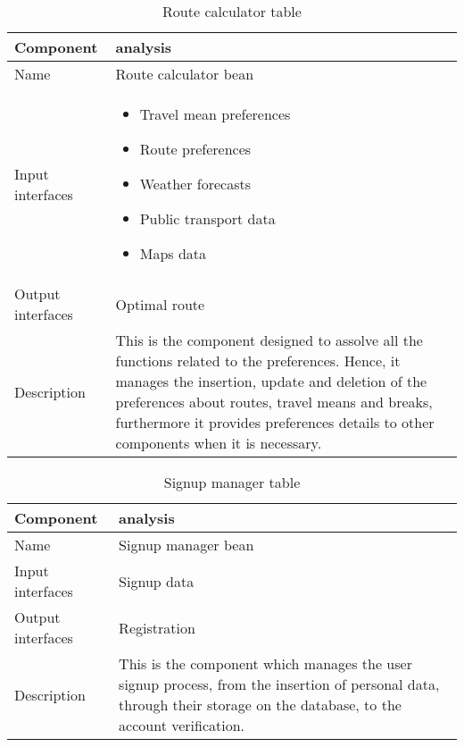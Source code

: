 \begin{flushleft}
	
	\begin{table}[htp]
		
		\begin{tabular}{l|p{7cm}}
			Component&analysis\\
			\hline
			\hline
			Name&Route calculator bean\\
			\hline
			Input interfaces& 
			\begin{itemize}
				\item Travel mean preferences \item Route preferences \item Weather forecasts \item Public transport data \item Maps data
			\end{itemize} \\
			\hline
			Output interfaces& Optimal route\\
			\hline
			Description&This is the component designed to assolve all the functions related to the preferences. Hence, it manages the insertion, update and deletion of the preferences about routes, travel means and breaks, furthermore it provides preferences details to other components when it is necessary. \\
			\hline
			
		\end{tabular}
		
		\caption{Route calculator table } 
		\label{tab:routecalculatortable}
		
	\end{table}
	
\end{flushleft}

\begin{flushleft}
	
	\begin{table}[htp]
		
		\begin{tabular}{l|p{7cm}}
			Component&analysis\\
			\hline
			\hline
			Name&Signup manager bean\\
			\hline
			Input interfaces& Signup data \\
			\hline
			Output interfaces& Registration\\
			\hline
			Description&This is the component which manages the user signup process, from the insertion of personal data, through their storage on the database, to the account verification. \\
			\hline
			
		\end{tabular}
		
		\caption{Signup manager table } 
		\label{tab:signupmanagertable}
		
	\end{table}
	
\end{flushleft}

